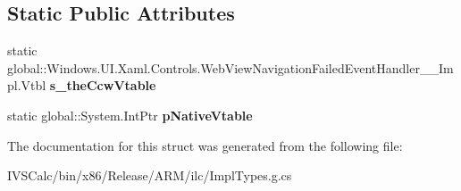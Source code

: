 \subsection*{Static Public Attributes}
\begin{DoxyCompactItemize}
\item 
\mbox{\label{struct_windows_1_1_u_i_1_1_xaml_1_1_controls_1_1_web_view_navigation_failed_event_handler_____impl_1_1_vtbl_a8c9c1fdc6bbeffa6ac1b0afadfc681bc}} 
static global\+::\+Windows.\+U\+I.\+Xaml.\+Controls.\+Web\+View\+Navigation\+Failed\+Event\+Handler\+\_\+\+\_\+\+Impl.\+Vtbl {\bfseries s\+\_\+the\+Ccw\+Vtable}
\item 
\mbox{\label{struct_windows_1_1_u_i_1_1_xaml_1_1_controls_1_1_web_view_navigation_failed_event_handler_____impl_1_1_vtbl_acdfac09a2f5436fa094cad4499385adf}} 
static global\+::\+System.\+Int\+Ptr {\bfseries p\+Native\+Vtable}
\end{DoxyCompactItemize}


The documentation for this struct was generated from the following file\+:\begin{DoxyCompactItemize}
\item 
I\+V\+S\+Calc/bin/x86/\+Release/\+A\+R\+M/ilc/Impl\+Types.\+g.\+cs\end{DoxyCompactItemize}
